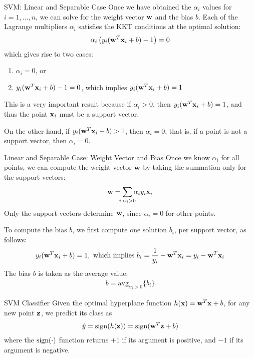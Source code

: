 \begin{frame}{SVM: Linear and Separable Case}
Once we have obtained the $\alpha_i$ values for $i=1,\ldots, n$,
we can solve for the weight vector $\mathbf{w}$ and the bias $b$. Each of the
Lagrange multipliers $\alpha_i$ satisfies the KKT conditions at the
optimal solution:
\begin{align*}
  \alpha_i \left(y_i (\mathbf{w}^T\mathbf{x}_i + b) - 1\right) = 0
\end{align*}
which gives rise to two cases:
\begin{enumerate}[(1)]
\item $\alpha_i = 0$, or
\item $y_i (\mathbf{w}^T\mathbf{x}_i + b) - 1 = 0$, which implies
  $y_i (\mathbf{w}^T\mathbf{x}_i + b) = 1$
\end{enumerate}

\medskip
This is a very important result because if $\alpha_i
> 0$, then $y_i (\mathbf{w}^T\mathbf{x}_i + b) = 1$, and thus the point $\mathbf{x}_i$
must be a support vector. 

\medskip
On the other hand, if $y_i (\mathbf{w}^T\mathbf{x}_i +
b) > 1$, then $\alpha_i = 0$, that is, if a point is not a support
vector, then $\alpha_i = 0$.
\end{frame}


\begin{frame}{Linear and Separable Case: Weight Vector and Bias}
Once we know $\alpha_i$ for all points, we can compute the weight
vector $\mathbf{w}$ by taking the
summation only for the support vectors:
\begin{align*}
    \bw = \dsum_{\mathclap{i, \alpha_i > 0}} \alpha_i y_i \bx_i
\end{align*}
Only the support vectors determine $\mathbf{w}$, since 
$\alpha_i=0$ for other points.

To compute the bias $b$, we f\/{i}rst compute one solution $b_i$, per
support vector, as follows:
\begin{align*}
  y_i (\mathbf{w}^T\mathbf{x}_i + b) = 1, \text{ which implies }
  b_i = {1 \over y_i} - \mathbf{w}^T\mathbf{x}_i = y_i - \mathbf{w}^T\mathbf{x}_i
\end{align*}
The bias $b$ is taken as the average value:
\begin{align*}
   b = \displaystyle \mbox{avg}_{\alpha_i > 0} \{ b_i\}
\end{align*}
\end{frame}



\begin{frame}{SVM Classif\/{i}er}
Given the optimal hyperplane function $h(\mathbf{x}) = \mathbf{w}^T\mathbf{x} + b$,
for any new point $\mathbf{z}$, we predict its class as
\begin{align*}
  \hat{y}  =  \operatorname{sign}(h(\mathbf{z})) = \operatorname{sign}(\mathbf{w}^T\mathbf{z} + b)
\end{align*}
where the $\operatorname{sign}(\cdot)$ function returns $+1$ if its argument is positive, and
$-1$ if its argument is negative.
\end{frame}




